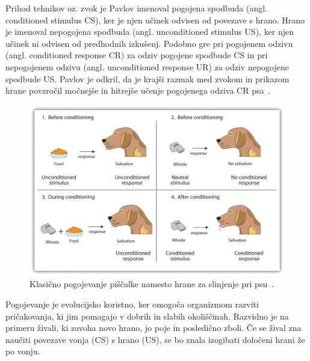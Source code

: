 \documentclass[a4paper, oneside, 12pt]{report}
\begin{document}
Prihod tehnikov oz. zvok je Pavlov imenoval pogojena spodbuda (angl. conditioned stimulus CS), ker je njen učinek odvisen od povezave s hrano. Hrano je imenoval nepogojena spodbuda (angl. unconditioned stimulus US), ker njen učinek ni odvisen od predhodnih izkušenj. Podobno gre pri pogojenem odzivu (angl. conditioned response CR) za odziv pogojene spodbude CS in pri nepogojenem odzivu (angl. unconditioned response UR) za odziv nepogojene spodbude US. Pavlov je odkril, da je krajši razmak med zvokom in prikazom hrane povzročil močnejše in hitrejše učenje pogojenega odziva CR psa~\cite{PsychologyAStudentFriendlyApproach}.

\begin{figure}[htbp]
\includegraphics[scale=0.226]{WhistleAndDog.jpg}
\caption{Klasično pogojevanje piščalke namesto hrane za slinjenje pri psu~\cite{IntroductionToPsychology}.}
\label{figure:WhistleAndDog}
\end{figure}

Pogojevanje je evolucijsko koristno, ker omogoča organizmom razviti pričakovanja, ki jim pomagajo v dobrih in slabih okoliščinah. Razvidno je na primeru živali, ki zavoha novo hrano, jo poje in posledično zboli. Če se žival zna naučiti povezave vonja (CS) s hrano (US), se bo znala izogibati določeni hrani že po vonju.

\end{document}
